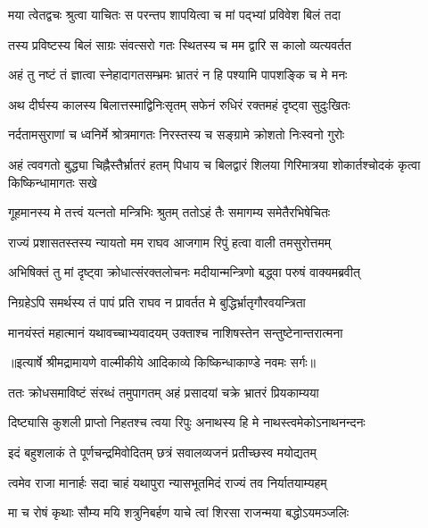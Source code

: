 \twolineshloka
{मया त्वेतद्वचः श्रुत्वा याचितः स परन्तप}
{शापयित्वा च मां पद्भ्यां प्रविवेश बिलं तदा} %

\twolineshloka
{तस्य प्रविष्टस्य बिलं साग्रः संवत्सरो गतः}
{स्थितस्य च मम द्वारि स कालो व्यत्यवर्तत} %

\twolineshloka
{अहं तु नष्टं तं ज्ञात्वा स्नेहादागतसम्भ्रमः}
{भ्रातरं न हि पश्यामि पापशङ्कि च मे मनः} %

\twolineshloka
{अथ दीर्घस्य कालस्य बिलात्तस्माद्विनिःसृतम्}
{सफेनं रुधिरं रक्तमहं दृष्ट्वा सुदुःखितः} %

\twolineshloka
{नर्दतामसुराणां च ध्वनिर्मे श्रोत्रमागतः}
{निरस्तस्य च सङ्ग्रामे क्रोशतो निःस्वनो गुरोः} %

\threelineshloka
{अहं त्ववगतो बुद्ध्या चिह्नैस्तैर्भ्रातरं हतम्}
{पिधाय च बिलद्वारं शिलया गिरिमात्रया}
{शोकार्तश्चोदकं कृत्वा किष्किन्धामागतः सखे} %

\twolineshloka
{गूहमानस्य मे तत्त्वं यत्नतो मन्त्रिभिः श्रुतम्}
{ततोऽहं तैः समागम्य समेतैरभिषेचितः} %

\twolineshloka
{राज्यं प्रशासतस्तस्य न्यायतो मम राघव}
{आजगाम रिपुं हत्वा वाली तमसुरोत्तमम्} %

\twolineshloka
{अभिषिक्तं तु मां दृष्ट्वा क्रोधात्संरक्तलोचनः}
{मदीयान्मन्त्रिणो बद्ध्वा परुषं वाक्यमब्रवीत्} %

\twolineshloka
{निग्रहेऽपि समर्थस्य तं पापं प्रति राघव}
{न प्रावर्तत मे बुद्धिर्भ्रातृगौरवयन्त्रिता} %

\twolineshloka
{मानयंस्तं महात्मानं यथावच्चाभ्यवादयम्}
{उक्ताश्च नाशिषस्तेन सन्तुष्टेनान्तरात्मना} %


{॥इत्यार्षे श्रीमद्रामायणे वाल्मीकीये आदिकाव्ये किष्किन्धाकाण्डे नवमः सर्गः॥}


\twolineshloka
{ततः क्रोधसमाविष्टं संरब्धं तमुपागतम्}
{अहं प्रसादयां चक्रे भ्रातरं प्रियकाम्यया} %

\twolineshloka
{दिष्ट्यासि कुशली प्राप्तो निहतश्च त्वया रिपुः}
{अनाथस्य हि मे नाथस्त्वमेकोऽनाथनन्दनः} %

\twolineshloka
{इदं बहुशलाकं ते पूर्णचन्द्रमिवोदितम्}
{छत्रं सवालव्यजनं प्रतीच्छस्व मयोद्यतम्} %

\twolineshloka
{त्वमेव राजा मानार्हः सदा चाहं यथापुरा}
{न्यासभूतमिदं राज्यं तव निर्यातयाम्यहम्} %

\twolineshloka
{मा च रोषं कृथाः सौम्य मयि शत्रुनिबर्हण}
{याचे त्वां शिरसा राजन्मया बद्धोऽयमञ्जलिः} %

